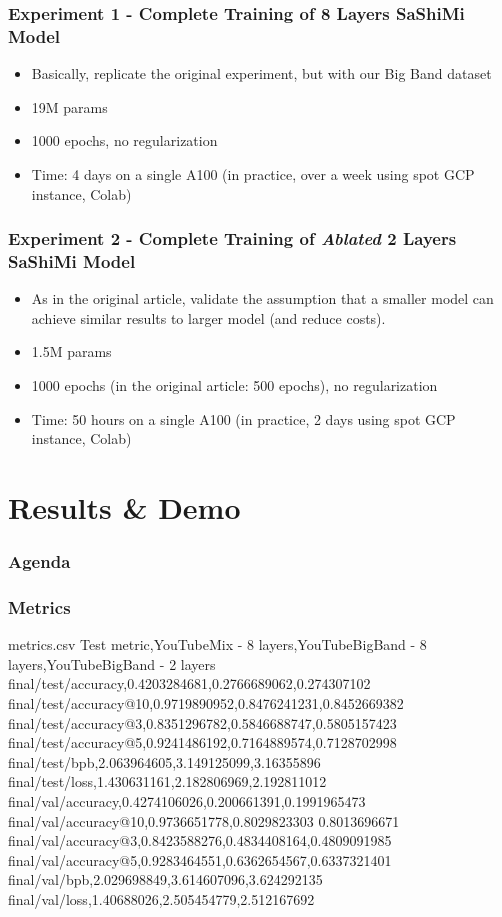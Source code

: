 \documentclass{beamer}
\begin{document}
\begin{frame}
    \frametitle{Experiment 1 - Complete Training of 8 Layers SaShiMi Model}
    \begin{itemize}
        \item Basically, replicate the original experiment, but with our Big Band dataset
        \item 19M params
        \item 1000 epochs, no regularization
        \item Time: 4 days on a single A100 (in practice, over a week using spot GCP instance, Colab)
    \end{itemize}
\end{frame}

\begin{frame}
    \frametitle{Experiment 2 - Complete Training of \textit{Ablated} 2 Layers SaShiMi Model}
    \begin{itemize}
        \item As in the original article, validate the assumption that a smaller model can achieve similar results to larger model (and reduce costs).
        \item 1.5M params
        \item 1000 epochs (in the original article: 500 epochs), no regularization
        \item Time: 50 hours on a single A100 (in practice, 2 days using spot GCP instance, Colab)
    \end{itemize}
\end{frame}

\section{Results \& Demo}
\begin{frame}
    \frametitle{Agenda}
    \tableofcontents[currentsection]
\end{frame}

\begin{frame}[fragile]
    \frametitle{Metrics}
    \begin{filecontents*}{metrics.csv}
        Test metric,YouTubeMix - 8 layers,YouTubeBigBand - 8 layers,YouTubeBigBand - 2 layers
        final/test/accuracy,0.4203284681,0.2766689062,0.274307102
        final/test/accuracy@10,0.9719890952,0.8476241231,0.8452669382
        final/test/accuracy@3,0.8351296782,0.5846688747,0.5805157423
        final/test/accuracy@5,0.9241486192,0.7164889574,0.7128702998
        final/test/bpb,2.063964605,3.149125099,3.16355896
        final/test/loss,1.430631161,2.182806969,2.192811012
        final/val/accuracy,0.4274106026,0.200661391,0.1991965473
        final/val/accuracy@10,0.9736651778,0.8029823303	0.8013696671
        final/val/accuracy@3,0.8423588276,0.4834408164,0.4809091985
        final/val/accuracy@5,0.9283464551,0.6362654567,0.6337321401
        final/val/bpb,2.029698849,3.614607096,3.624292135
        final/val/loss,1.40688026,2.505454779,2.512167692
    \end{filecontents*}
\end{frame}
\end{document}
